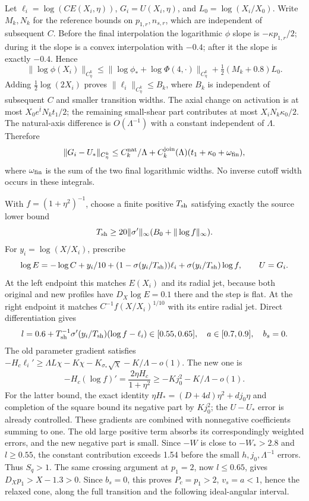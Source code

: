 \documentclass[10pt,a4paper]{article}
\begin{document}
Let \(\ell_i=\log(CE(X_i,\eta))\), \(G_i=U(X_i,\eta)\), and \(L_0=\log(X_i/X_0)\). Write \(M_k,N_k\) for the reference bounds on \(p_{1,r},n_{s,r}\), which are independent of subsequent \(C\). Before the final interpolation the logarithmic \(\phi\) slope is \(-\kappa p_{1,r}/2\); during it the slope is a convex interpolation with \(-0.4\); after it the slope is exactly \(-0.4\). Hence
\[
\|\log\phi(X_i)\|_{C^k_\eta}
\le\|\log\phi_*+\log\Phi(4,\cdot)\|_{C^k_\eta}
+\tfrac12(M_k+0.8)L_0.
\]
Adding \(\frac12\log(2X_i)\) proves \(\|\ell_i\|_{C^k_\eta}\le B_k\), where \(B_k\) is independent of subsequent \(C\) and smaller transition widths. The axial change on activation is at most \(X_0e^{\bar t}N_kt_1/2\); the remaining small-shear part contributes at most \(X_iN_k\kappa_0/2\). The natural-axis difference is \(O(\Lambda^{-1})\) with a constant independent of \(\Lambda\). Therefore
\[
\|G_i-U_*\|_{C^k_\eta}
\le C_k^{\rm nat}/\Lambda+C_k^{\rm join}(\Lambda)(t_1+\kappa_0+\omega_{\rm fin}),
\]
where \(\omega_{\rm fin}\) is the sum of the two final logarithmic widths. No inverse cutoff width occurs in these integrals.

With \(f=(1+\eta^2)^{-1}\), choose a finite positive \(T_{\rm sh}\) satisfying exactly the source lower bound
\[
T_{\rm sh}\ge20\|\sigma'\|_\infty(B_0+\|\log f\|_\infty).
\]
For \(y_i=\log(X/X_i)\), prescribe
\[
\log E=-\log C+y_i/10+(1-\sigma(y_i/T_{\rm sh}))\ell_i
+\sigma(y_i/T_{\rm sh})\log f,\qquad U=G_i.
\]
At the left endpoint this matches \(E(X_i)\) and its radial jet, because both original and new profiles have \(D_X\log E=0.1\) there and the step is flat. At the right endpoint it matches \(C^{-1}f(X/X_i)^{1/10}\) with its entire radial jet. Direct differentiation gives
\[
l=0.6+T_{\rm sh}^{-1}\sigma'(y_i/T_{\rm sh})(\log f-\ell_i)
\in[0.55,0.65],\quad a\in[0.7,0.9],\quad b_s=0.
\]
The old parameter gradient satisfies
\(-H_c\ell_i'\ge\Lambda L\chi-K\chi-K_{\sigma_*}\sqrt\chi-K/\Lambda-o(1)\).
The new one is
\[
-H_c(\log f)'=\frac{2\eta H_c}{1+\eta^2}
\ge-Kj_0^2-K/\Lambda-o(1).
\]
For the latter bound, the exact identity
\(\eta H_*=(D+4d)\eta^2+dj_0\eta\)
and completion of the square bound its negative part by \(Kj_0^2\); the \(U-U_*\) error is already controlled. These gradients are combined with nonnegative coefficients summing to one. The old large positive term absorbs its correspondingly weighted errors, and the new negative part is small. Since \(-W\) is close to \(-W_*>2.8\) and \(l\ge0.55\), the constant contribution exceeds 1.54 before the small \(h,j_0,\Lambda^{-1}\) errors. Thus \(S_q>1\). The same crossing argument at \(p_1=2\), now \(l\le0.65\), gives \(D_Xp_1>X-1.3>0\). Since \(b_s=0\), this proves \(P_c=p_1>2\), \(v_s=a<1\), hence the relaxed cone, along the full transition and the following ideal-angular interval.
\end{document}
